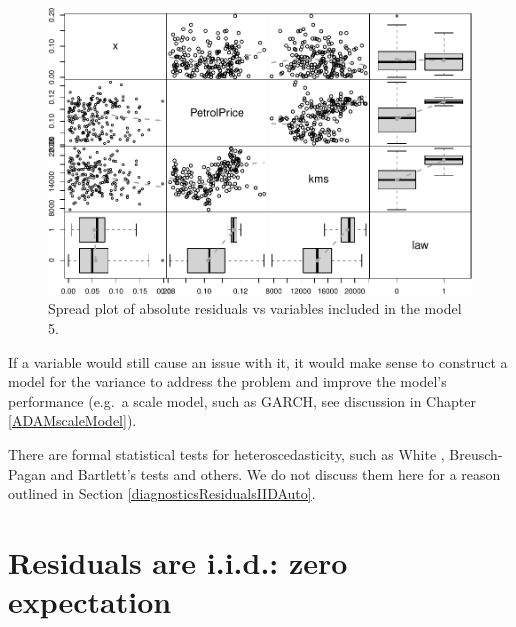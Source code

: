 \documentclass[]{book}
\theoremstyle{definition}
\theoremstyle{definition}
\theoremstyle{definition}
\theoremstyle{definition}
\theoremstyle{remark}
\begin{document}
\begin{figure}
\centering
\includegraphics{Svetunkov--2022----ADAM_files/figure-latex/adamSeat05Spread-1.pdf}
\caption{\label{fig:adamSeat05Spread}Spread plot of absolute residuals vs variables included in the model 5.}
\end{figure}

If a variable would still cause an issue with it, it would make sense to construct a model for the variance to address the problem and improve the model's performance (e.g.~a scale model, such as GARCH, see discussion in Chapter \ref{ADAMscaleModel}).

There are formal statistical tests for heteroscedasticity, such as White \citep{WikipediaWhite2021}, Breusch-Pagan \citep{WikipediaBreuschPagan2021} and Bartlett's \citep{WikipediaBartlett2021} tests and others. We do not discuss them here for a reason outlined in Section \ref{diagnosticsResidualsIIDAuto}.

\hypertarget{diagnosticsResidualsIIDExpectation}{%
\section{Residuals are i.i.d.: zero expectation}\label{diagnosticsResidualsIIDExpectation}}
\end{document}
